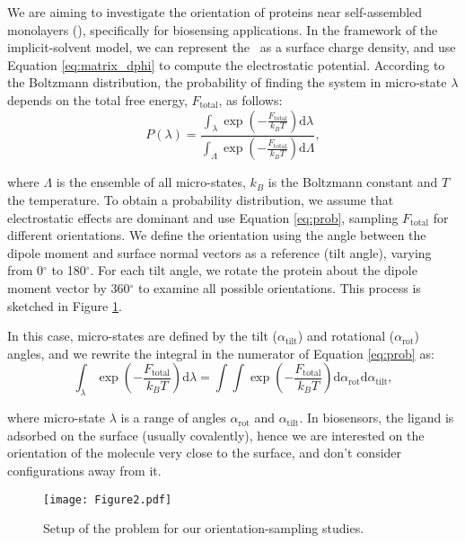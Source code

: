 
We are aiming to investigate the orientation of proteins near self-assembled monolayers (\sam), specifically for biosensing applications. In the framework of the implicit-solvent model, we can represent the \sam\ as a surface charge density, and use Equation \eqref{eq:matrix_dphi} to compute the electrostatic potential. 
According to the Boltzmann distribution, the probability of finding the system in micro-state $\lambda$ depends on the total free energy, $F_\text{total}$, as follows:
%
\begin{equation} \label{eq:prob}
P(\lambda) = \frac{\int_{\lambda} \exp \left(-\frac{F_\text{total}}{k_B T} \right) \text{d} \lambda}{\int_{\Lambda} \exp \left(-\frac{F_\text{total}}{k_B T} \right) \text{d} \Lambda},
\end{equation} 

\noindent where $\Lambda$ is the ensemble of all micro-states, $k_B$ is the Boltzmann constant and $T$ the temperature. To obtain a probability distribution, we assume that electrostatic effects are dominant and use Equation \eqref{eq:prob}, sampling $F_\text{total}$ for different orientations. We define the orientation using the angle between the dipole moment and surface normal vectors as a reference (tilt angle), varying from 0$^\circ$ to 180$^\circ$. For each tilt angle, we rotate the protein about the dipole moment vector by 360$^\circ$ to examine all possible orientations. This process is sketched in Figure \ref{fig:1pgb_orientation}.

In this case, micro-states are defined by the tilt ($\alpha_{\text{tilt}}$) and rotational ($\alpha_{\text{rot}}$) angles, and we rewrite the integral in the numerator of Equation \eqref{eq:prob} as:
%
\begin{equation} \label{eq:prob_angle}
\int_{\lambda} \exp \left(-\frac{F_\text{total}}{k_B T} \right) \text{d} \lambda = \int \int \exp \left(-\frac{F_\text{total}}{k_B T} \right) \text{d} \alpha_{\text{rot}} \text{d} \alpha_{\text{tilt}},
\end{equation}

\noindent where micro-state $\lambda$ is a range of angles $\alpha_{\text{rot}}$ and $\alpha_{\text{tilt}}$. 
In biosensors, the ligand is adsorbed on the surface (usually covalently), hence we are interested on the orientation of the molecule very close to the surface, and don't consider configurations away from it.  


\begin{figure}%
   \centering
   \texttt{[image: Figure2.pdf]}
   \caption{Setup of the problem for our orientation-sampling studies.}
   \label{fig:1pgb_orientation}
\end{figure}

